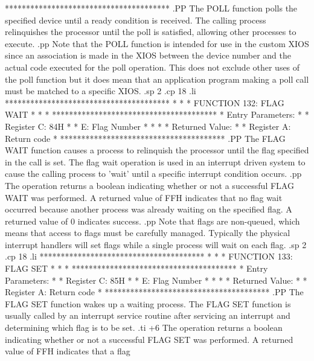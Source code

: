 ***************************************
.PP
The POLL function polls the specified device
until a ready condition is received.  The calling process relinquishes
the processor until the poll is satisfied, allowing other processes
to execute.
.pp
Note that the POLL function is intended for use in the custom XIOS
since an association is made in the XIOS between the device number
and the actual code executed for the poll operation.  This does not
exclude other uses of the poll function but it does mean that an
application program making a poll call must be matched to a specific
XIOS.
.sp 2
.cp 18
.li
***************************************
*                                     *
*  FUNCTION 132:  FLAG WAIT           *
*                                     *
***************************************
*  Entry Parameters:                  *
*      Register   C:  84H             *
*                 E:  Flag Number     *
*                                     *
*  Returned   Value:                  *
*      Register   A:  Return code     *
***************************************
.PP
The FLAG WAIT function causes a process to
relinquish the processor until the flag specified in the call is set.
The flag wait operation is used in an interrupt driven
system to cause the calling process to 'wait' until a specific
interrupt condition occurs.
.pp
The operation returns a boolean indicating whether or not a successful
FLAG WAIT was performed.  A returned value of FFH indicates that no
flag wait occurred because another process was already waiting on
the specified flag.  A returned value of 0 indicates success.
.pp
Note that flags are non-queued, which means that access to flags
must be carefully managed.  Typically the physical interrupt handlers
will set flags while a single process will wait on each flag.
.sp 2
.cp 18
.li
***************************************
*                                     *
*  FUNCTION 133:  FLAG SET            *
*                                     *
***************************************
*  Entry Parameters:                  *
*      Register   C:  85H             *
*                 E:  Flag Number     *
*                                     *
*  Returned   Value:                  *
*      Register   A:  Return code     *
***************************************
.PP
The FLAG SET function wakes up a waiting process.
The FLAG SET function is usually called by an interrupt service
routine after servicing an interrupt and determining which flag is
to be set.
.ti +6
The operation returns a boolean indicating whether or not a successful
FLAG SET was performed.  A returned value of FFH indicates that a flag
